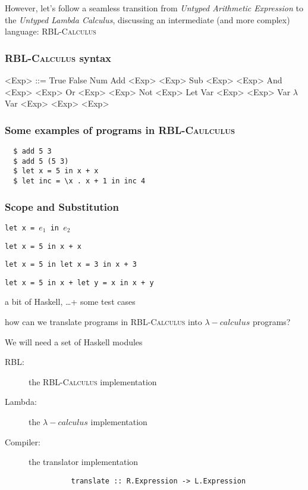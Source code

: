\documentclass{beamer}
\begin{document}
\begin{frame}
  However, let's follow a seamless
  transition from \emph{Untyped Arithmetic Expression}
  to the \emph{Untyped Lambda Calculus}\pause, discussing
  an intermediate (and more complex) language: \textsc{RBL-Calculus} 
\end{frame}

\begin{frame}
  \frametitle{\textsc{RBL-Calculus} syntax}

\begin{grammar}
  <Exp> ::= True
  \alt False
  \alt Num
  \alt Add <Exp> <Exp> \alt Sub <Exp> <Exp> 
  \alt And <Exp> <Exp> \alt Or <Exp> <Exp> \alt Not <Exp>
  \alt Let Var <Exp> <Exp>
  \alt Var 
  \alt $\lambda$ Var  <Exp>
  \alt <Exp> <Exp> 
\end{grammar}
\end{frame}

\begin{frame}[fragile]
  \frametitle{Some examples of programs in \textsc{RBL-Caulculus}}

\begin{verbatim}
  $ add 5 3 
  $ add 5 (5 3) 
  $ let x = 5 in x + x
  $ let inc = \x . x + 1 in inc 4   
\end{verbatim} 
\end{frame}

\begin{frame}
  \frametitle{Scope and Substitution}

  \texttt{let x = $e_1$ in $e_2$} \pause
  
  \texttt{let x = 5 in x + x} \pause 

  \texttt{let x = 5 in let x = 3 in x + 3} \pause  

  \texttt{let x = 5 in x + let y = x in x + y} 

\end{frame}

\begin{frame}
\huge{a bit of Haskell, \ldots + some test cases} 
\end{frame}

\begin{frame}[fragile]
  how can we translate programs in \textsc{RBL-Calculus} into
  \textsc{$\lambda-calculus$} programs?

  \pause

  \begin{block}{We will need a set of Haskell modules}
    \begin{description}
      \item[RBL:] the \textsc{RBL-Calculus} implementation
      \item[Lambda:] the \textsc{$\lambda-calculus$} implementation
      \item[Compiler:] the translator implementation
       \begin{verbatim}
          translate :: R.Expression -> L.Expression
       \end{verbatim}
    \end{description}
  \end{block}
\end{frame}
\end{document}
